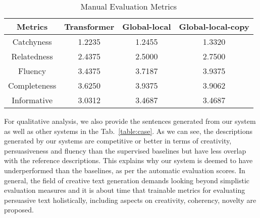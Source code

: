\documentclass[sigconf]{acmart}
\begin{document}
\begin{table}
  \caption{Manual Evaluation Metrics}
  \label{table:evaluation-manual}
  \begin{tabular}{c c c c}
    \toprule
    Metrics & Transformer & Global-local & Global-local-copy\\
    \midrule
    Catchyness & 1.2235 & 1.2455 & 1.3320\\
    Relatedness & 2.4375 & 2.5000 & 2.7500\\
    Fluency & 3.4375 & 3.7187 & 3.9375\\
    Completeness & 3.6250 & 3.9375 & 3.9062\\
    Informative & 3.0312 & 3.4687 & 3.4687 \\
  \bottomrule
\end{tabular}
\end{table}

For qualitative analysis, we also provide the sentences generated from our system as well as other systems in the Tab.~\ref{table:case}. As we can see, the descriptions generated by our systems are competitive or better in terms of creativity, persuasiveness and fluency than the supervised baselines but have less overlap with the reference descriptions. This explains why our system is deemed to have underperformed than the baselines, as per the automatic evaluation scores. In general, the field of creative text generation demands looking beyond simplistic evaluation measures and it is about time that trainable metrics for evaluating persuasive text holistically, including aspects on creativity, coherency, novelty are proposed.
\end{document}
